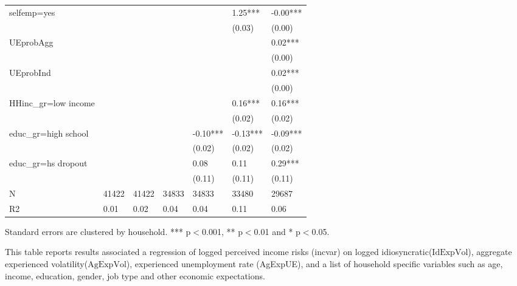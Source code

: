 \begin{table}[p]
\begin{adjustbox}{width=\textwidth}
\begin{threeparttable}
\begin{tabular}{lllllll}
selfemp=yes         &          &           &            &             &      1.25*** &      -0.00*** \\
                    &          &           &            &             &       (0.03) &        (0.00) \\
UEprobAgg           &          &           &            &             &              &       0.02*** \\
                    &          &           &            &             &              &        (0.00) \\
UEprobInd           &          &           &            &             &              &       0.02*** \\
                    &          &           &            &             &              &        (0.00) \\
HHinc\_gr=low income &          &           &            &             &      0.16*** &       0.16*** \\
                    &          &           &            &             &       (0.02) &        (0.02) \\
educ\_gr=high school &          &           &            &    -0.10*** &     -0.13*** &      -0.09*** \\
                    &          &           &            &      (0.02) &       (0.02) &        (0.02) \\
educ\_gr=hs dropout  &          &           &            &        0.08 &         0.11 &       0.29*** \\
                    &          &           &            &      (0.11) &       (0.11) &        (0.11) \\
N                   &    41422 &     41422 &      34833 &       34833 &        33480 &         29687 \\
R2                  &     0.01 &      0.02 &       0.04 &        0.04 &         0.11 &          0.06 \\
\bottomrule
\end{tabular}
\begin{tablenotes}\item Standard errors are clustered by household. *** p$<$0.001, ** p$<$0.01 and * p$<$0.05. 
\item This table reports results associated a regression of logged perceived income risks (incvar) on logged idiosyncratic($\text{IdExpVol}$), aggregate experienced volatility($\text{AgExpVol}$), experienced unemployment rate (AgExpUE), and a list of household specific variables such as age, income, education, gender, job type and other economic expectations.
\end{tablenotes}
\end{threeparttable}
\end{adjustbox}
\end{table}
\clearpage

